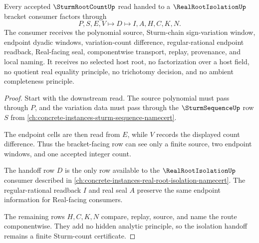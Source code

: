 \begin{theorem}
\label{thm:sturm-root-count-isolation-handoff}
Every accepted $\SturmRootCountUp$ read handed to a $\RealRootIsolationUp$ bracket consumer factors through
$$
P,S,E,V \longmapsto D \longmapsto I,A,H,C,K,N .
$$
The consumer receives the polynomial source, Sturm-chain sign-variation window, endpoint dyadic windows, variation-count difference, regular-rational endpoint readback, Real-facing seal, componentwise transport, replay, provenance, and local naming. It receives no selected host root, no factorization over a host field, no quotient real equality principle, no trichotomy decision, and no ambient completeness principle.
\end{theorem}
\begin{proof}
Start with the downstream read. The source polynomial must pass through $P$, and the variation data must pass through the $\SturmSequenceUp$ row $S$ from \autoref{ch:concrete-instances-sturm-sequence-namecert}.

The endpoint cells are then read from $E$, while $V$ records the displayed count difference. Thus the bracket-facing row can see only a finite source, two endpoint windows, and one accepted integer count.

The handoff row $D$ is the only row available to the $\RealRootIsolationUp$ consumer described in \autoref{ch:concrete-instances-real-root-isolation-namecert}. The regular-rational readback $I$ and real seal $A$ preserve the same endpoint information for Real-facing consumers.

The remaining rows $H,C,K,N$ compare, replay, source, and name the route componentwise. They add no hidden analytic principle, so the isolation handoff remains a finite Sturm-count certificate.
\end{proof}



